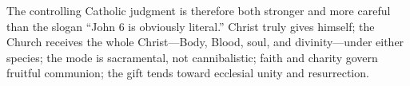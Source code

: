 The controlling Catholic judgment is therefore both stronger and more careful
than the slogan ``John 6 is obviously literal.'' Christ truly gives himself;
the Church receives the whole Christ---Body, Blood, soul, and divinity---under
either species; the mode is sacramental, not cannibalistic; faith and charity
govern fruitful communion; the gift tends toward ecclesial unity and
resurrection.

